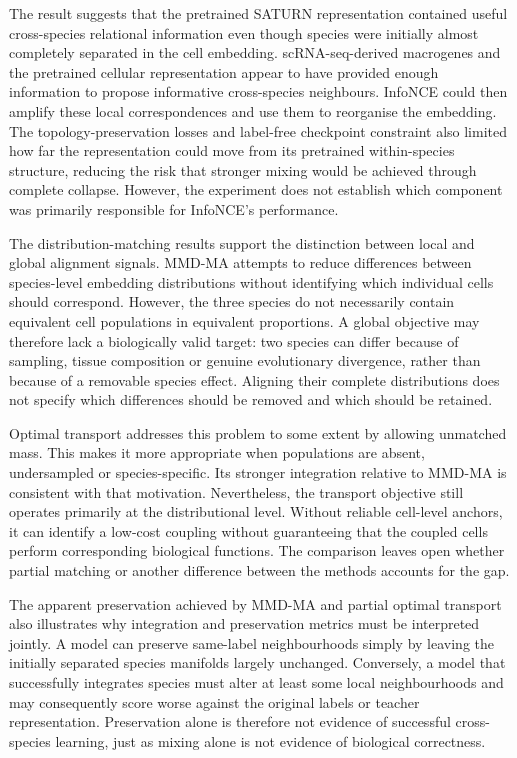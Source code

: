 \documentclass{article}
\begin{document}
The result suggests that the pretrained SATURN representation contained useful cross-species relational information even though species were initially almost completely separated in the cell embedding. scRNA-seq-derived macrogenes and the pretrained cellular representation appear to have provided enough information to propose informative cross-species neighbours. InfoNCE could then amplify these local correspondences and use them to reorganise the embedding. The topology-preservation losses and label-free checkpoint constraint also limited how far the representation could move from its pretrained within-species structure, reducing the risk that stronger mixing would be achieved through complete collapse. However, the experiment does not establish which component was primarily responsible for InfoNCE's performance.

The distribution-matching results support the distinction between local and global alignment signals. MMD-MA attempts to reduce differences between species-level embedding distributions without identifying which individual cells should correspond. However, the three species do not necessarily contain equivalent cell populations in equivalent proportions. A global objective may therefore lack a biologically valid target: two species can differ because of sampling, tissue composition or genuine evolutionary divergence, rather than because of a removable species effect. Aligning their complete distributions does not specify which differences should be removed and which should be retained.

Optimal transport addresses this problem to some extent by allowing unmatched mass. This makes it more appropriate when populations are absent, undersampled or species-specific. Its stronger integration relative to MMD-MA is consistent with that motivation. Nevertheless, the transport objective still operates primarily at the distributional level. Without reliable cell-level anchors, it can identify a low-cost coupling without guaranteeing that the coupled cells perform corresponding biological functions. The comparison leaves open whether partial matching or another difference between the methods accounts for the gap.

The apparent preservation achieved by MMD-MA and partial optimal transport also illustrates why integration and preservation metrics must be interpreted jointly. A model can preserve same-label neighbourhoods simply by leaving the initially separated species manifolds largely unchanged. Conversely, a model that successfully integrates species must alter at least some local neighbourhoods and may consequently score worse against the original labels or teacher representation. Preservation alone is therefore not evidence of successful cross-species learning, just as mixing alone is not evidence of biological correctness.
\end{document}
